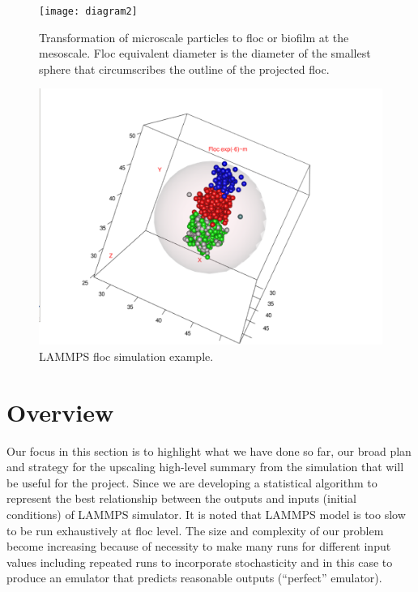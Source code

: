 \documentclass[12pt,titlepage]{report}
\theoremstyle{definition}
\theoremstyle{remark}
\begin{document}

\begin{figure}[!ht] 
\texttt{[image: diagram2]}
\caption[]{Transformation of microscale particles to floc or biofilm at the mesoscale. Floc equivalent diameter is the diameter of the smallest sphere that circumscribes the outline of the projected floc.}\label{diag2}
\end{figure}

\begin{figure}[!ht] 
\includegraphics[width=1.1\textwidth]{p2}
\caption[]{LAMMPS floc simulation example.}\label{f1}
\end{figure}

\section{Overview}
Our focus in this section is to highlight what we have done so far, our broad plan and strategy for the upscaling high-level summary from the simulation that will be useful for the project. Since we are developing a statistical algorithm to represent the best relationship between the outputs and inputs (initial conditions) of LAMMPS simulator. It is noted that LAMMPS model is too slow to be run exhaustively at floc level. 
The size and complexity of our problem become increasing because of necessity to make many runs for different input values including repeated runs to incorporate stochasticity and in this case to produce an emulator that predicts reasonable outputs (“perfect” emulator). %
\end{document}

